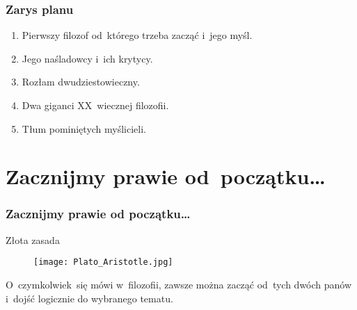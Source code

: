 \documentclass{beamer}  %
\begin{document}
\begin{frame}
  \frametitle{Zarys planu}

  \begin{block}{}
    \begin{enumerate}
    \item Pierwszy filozof od~którego trzeba zacząć i~jego myśl.
    \item Jego naśladowcy i~ich krytycy.
    \item Rozłam dwudziestowieczny.
    \item Dwa giganci XX~wiecznej filozofii.
    \item Tłum pominiętych myślicieli.
    \end{enumerate}
  \end{block}

\end{frame}





\section[]{Zacznijmy prawie od~początku\ldots}


\begin{frame}
  \frametitle{Zacznijmy prawie od początku\ldots}

  \begin{block}{Złota zasada}
    \begin{figure}
      \centering

      \texttt{[image: Plato\_Aristotle.jpg]}

    \end{figure}
  \end{block}

  \begin{block}{}
    O~czymkolwiek~się mówi w~filozofii, zawsze można zacząć od~tych
    dwóch panów i~dojść logicznie do wybranego tematu.
  \end{block}

\end{frame}
\end{document}
